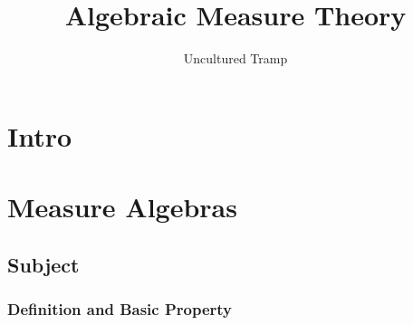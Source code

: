\documentclass[12pt]{scrartcl}
\author{Uncultured Tramp}
\title{Algebraic Measure Theory}
\renewcommand{\.}{\; . \;}
\begin{document}
\maketitle
\thispagestyle{empty}
\newpage
\thispagestyle{empty}
\tableofcontents
\newpage
\section*{Intro}
\newpage
{}
\section{Measure Algebras}
\subsection{Subject}
\subsubsection{Definition and Basic Property}
\end{document}
